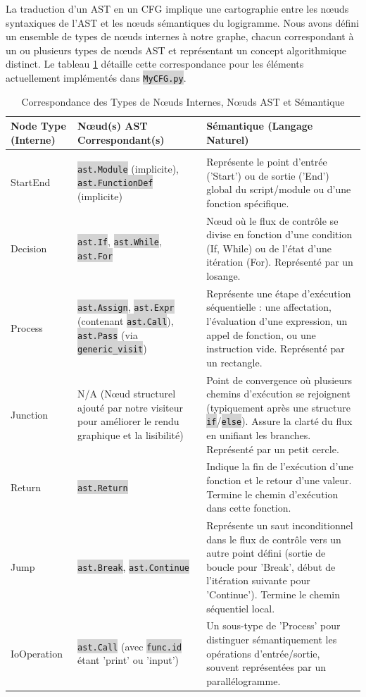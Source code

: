 \documentclass[11pt,a4paper]{article}
\newcommand{\code}[1]{\colorbox{lightgray}{\texttt{\small #1}}}
\begin{document}
La traduction d'un AST en un CFG implique une cartographie entre les nœuds syntaxiques de l'AST et les nœuds sémantiques du logigramme. Nous avons défini un ensemble de types de nœuds internes à notre graphe, chacun correspondant à un ou plusieurs types de nœuds AST et représentant un concept algorithmique distinct. Le tableau \ref{tab:node-types} détaille cette correspondance pour les éléments actuellement implémentés dans \code{MyCFG.py}.

\begin{longtable}{| p{3cm} | p{4cm} | p{8cm} |}
\caption{Correspondance des Types de Nœuds Internes, Nœuds AST et Sémantique}\label{tab:node-types}\\
\hline
\textbf{Node Type (Interne)} & \textbf{Nœud(s) AST Correspondant(s)} & \textbf{Sémantique (Langage Naturel)} \\
\hline
\endfirsthead
\hline
\endfoot
\hline
\multicolumn{3}{r}{\small\slshape Table suite en page suivante} \\
\hline
\endlastfoot
StartEnd & \code{ast.Module} (implicite), \code{ast.FunctionDef} (implicite) & Représente le point d'entrée ('Start') ou de sortie ('End') global du script/module ou d'une fonction spécifique. \\ \hline
Decision & \code{ast.If}, \code{ast.While}, \code{ast.For} & Nœud où le flux de contrôle se divise en fonction d'une condition (If, While) ou de l'état d'une itération (For). Représenté par un losange. \\ \hline
Process & \code{ast.Assign}, \code{ast.Expr} (contenant \code{ast.Call}), \code{ast.Pass} (via \code{generic\_visit}) & Représente une étape d'exécution séquentielle : une affectation, l'évaluation d'une expression, un appel de fonction, ou une instruction vide. Représenté par un rectangle. \\ \hline
Junction & N/A (Nœud structurel ajouté par notre visiteur pour améliorer le rendu graphique et la lisibilité) & Point de convergence où plusieurs chemins d'exécution se rejoignent (typiquement après une structure \code{if}/\code{else}). Assure la clarté du flux en unifiant les branches. Représenté par un petit cercle. \\ \hline
Return & \code{ast.Return} & Indique la fin de l'exécution d'une fonction et le retour d'une valeur. Termine le chemin d'exécution dans cette fonction. \\ \hline
Jump & \code{ast.Break}, \code{ast.Continue} & Représente un saut inconditionnel dans le flux de contrôle vers un autre point défini (sortie de boucle pour 'Break', début de l'itération suivante pour 'Continue'). Termine le chemin séquentiel local. \\ \hline
IoOperation & \code{ast.Call} (avec \code{func.id} étant 'print' ou 'input') & Un sous-type de 'Process' pour distinguer sémantiquement les opérations d'entrée/sortie, souvent représentées par un parallélogramme. \\ \hline
\end{longtable}
\end{document}
